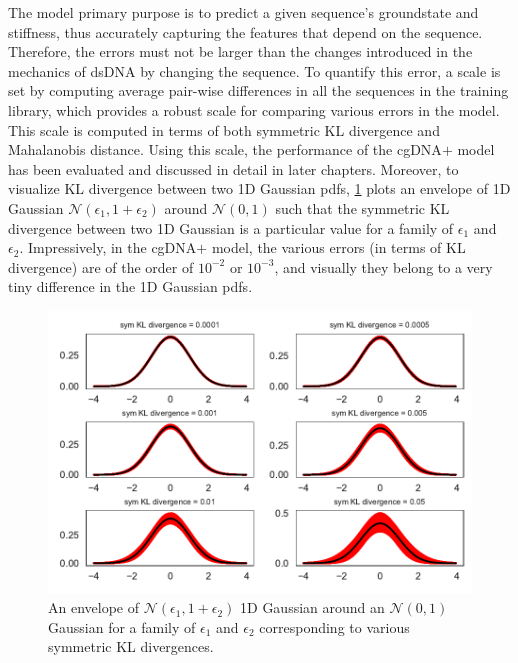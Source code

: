 The model primary purpose is to predict a given sequence's groundstate and stiffness, thus accurately capturing the features that depend on the sequence. 
Therefore, the errors must not be larger than the changes introduced in the mechanics of dsDNA by changing the sequence.
To quantify this error, 
a scale is set by computing average pair-wise differences in all the sequences in the training library, which provides a robust scale for comparing various errors in the model. This scale is computed in terms of both symmetric KL divergence and Mahalanobis distance.
Using this scale, the performance of the cgDNA$+$ model has been evaluated and discussed in detail in later chapters. 
Moreover, to visualize KL divergence between two 1D Gaussian pdfs, \cref{c2:KL_envelope} plots an envelope of 1D Gaussian $\mathcal{N}(\epsilon_1, 1 + \epsilon_2)$ around $\mathcal{N}(0,1)$ such that the symmetric KL divergence between two 1D Gaussian is a particular value for a family of $\epsilon_1$ and $\epsilon_2$.
Impressively, in the cgDNA$+$ model, the various errors (in terms of KL divergence) are of the order of $10^{-2}$ or $10^{-3}$, and visually they belong to a very tiny difference in the 1D Gaussian pdfs.
\begin{figure}[htb]
\begin{center}
\centering\includegraphics[scale=0.75,trim = 0cm .5cm 0cm 0cm]{images/KL_envelope}
\centering\caption{
An envelope of $\mathcal{N}(\epsilon_1, 1 + \epsilon_2)$ 1D Gaussian around an $\mathcal{N}(0,1)$ Gaussian for a family of $\epsilon_1$ and $\epsilon_2$ corresponding to various symmetric KL divergences.
}
\label{c2:KL_envelope}
\end{center}
\end{figure}
